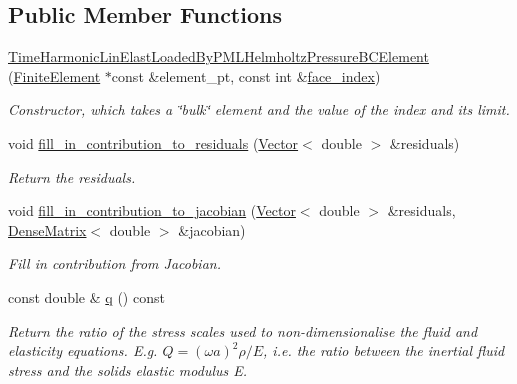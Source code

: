 \subsection*{Public Member Functions}
\begin{DoxyCompactItemize}
\item 
\hyperlink{classoomph_1_1TimeHarmonicLinElastLoadedByPMLHelmholtzPressureBCElement_aa22755297b70b0733797902787ffdcb1}{Time\+Harmonic\+Lin\+Elast\+Loaded\+By\+P\+M\+L\+Helmholtz\+Pressure\+B\+C\+Element} (\hyperlink{classoomph_1_1FiniteElement}{Finite\+Element} $\ast$const \&element\+\_\+pt, const int \&\hyperlink{classoomph_1_1FaceElement_a478d577ac6db67ecc80f1f02ae3ab170}{face\+\_\+index})
\begin{DoxyCompactList}\small\item\em Constructor, which takes a \char`\"{}bulk\char`\"{} element and the value of the index and its limit. \end{DoxyCompactList}\item 
void \hyperlink{classoomph_1_1TimeHarmonicLinElastLoadedByPMLHelmholtzPressureBCElement_a44261df2f1e5122ad707f17523a439c2}{fill\+\_\+in\+\_\+contribution\+\_\+to\+\_\+residuals} (\hyperlink{classoomph_1_1Vector}{Vector}$<$ double $>$ \&residuals)
\begin{DoxyCompactList}\small\item\em Return the residuals. \end{DoxyCompactList}\item 
void \hyperlink{classoomph_1_1TimeHarmonicLinElastLoadedByPMLHelmholtzPressureBCElement_aec08514d7dbb65dc5c05af3131828daa}{fill\+\_\+in\+\_\+contribution\+\_\+to\+\_\+jacobian} (\hyperlink{classoomph_1_1Vector}{Vector}$<$ double $>$ \&residuals, \hyperlink{classoomph_1_1DenseMatrix}{Dense\+Matrix}$<$ double $>$ \&jacobian)
\begin{DoxyCompactList}\small\item\em Fill in contribution from Jacobian. \end{DoxyCompactList}\item 
const double \& \hyperlink{classoomph_1_1TimeHarmonicLinElastLoadedByPMLHelmholtzPressureBCElement_a9a010f4abd0ef1d311841b1a80b89495}{q} () const
\begin{DoxyCompactList}\small\item\em Return the ratio of the stress scales used to non-\/dimensionalise the fluid and elasticity equations. E.\+g. $ Q = (\omega a)^2 \rho/E $, i.\+e. the ratio between the inertial fluid stress and the solid\textquotesingle{}s elastic modulus E. \end{DoxyCompactList}\item 

\end{DoxyCompactItemize}
